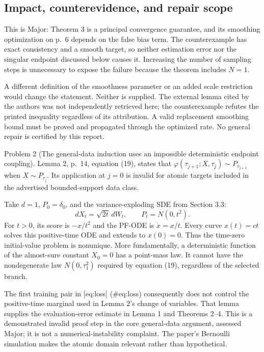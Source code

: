 \documentclass[10pt]{article}
\begin{document}
\subsection*{Impact, counterevidence, and repair scope}
This is Major: Theorem 3 is a principal convergence guarantee, and its smoothing optimization on p. 6 depends on the false bias term. The counterexample has exact consistency and a smooth target, so neither estimation error nor the singular endpoint discussed below causes it. Increasing the number of sampling steps is unnecessary to expose the failure because the theorem includes \(N=1\).\par
A different definition of the smoothness parameter or an added scale restriction would change the statement. Neither is supplied. The external lemma cited by the authors was not independently retrieved here; the counterexample refutes the printed inequality regardless of its attribution. A valid replacement smoothing bound must be proved and propagated through the optimized rate. No general repair is certified by this report.\par
Problem 2 (The general-data induction uses an impossible deterministic endpoint coupling).  Lemma 2, p. 14, equation (19), states that \(\varphi(\tau_{j+1};X,\tau_j)\sim P_{\tau_{j+1}}\) when \(X\sim P_{\tau_j}\). Its application at \(j=0\) is invalid for atomic targets included in the advertised bounded-support data class.\par
Take \(d=1\), \(P_0=\delta_0\), and the variance-exploding SDE from Section 3.3: \[dX_t=\sqrt{2t}\,dW_t,\qquad P_t=N(0,t^2).\] For \(t>0\), its score is \(-x/t^2\) and the PF-ODE is \(\dot x=x/t\). Every curve \(x(t)=ct\) solves this positive-time ODE and extends to \(x(0)=0\). Thus the time-zero initial-value problem is nonunique. More fundamentally, a deterministic function of the almost-sure constant \(X_0=0\) has a point-mass law. It cannot have the nondegenerate law \(N(0,\tau_1^2)\) required by equation (19), regardless of the selected branch.\par
The first training pair in [eq:loss] (\#eq:loss) consequently does not control the positive-time marginal used in Lemma 2’s change of variables. That lemma supplies the evaluation-error estimate in Lemma 1 and Theorems 2–4. This is a demonstrated invalid proof step in the core general-data argument, assessed Major; it is not a numerical-instability complaint. The paper’s Bernoulli simulation makes the atomic domain relevant rather than hypothetical.\par
\end{document}

